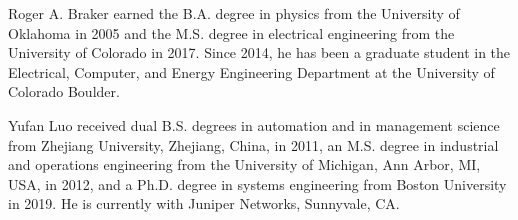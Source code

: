 \documentclass[journal]{IEEEtran}
\begin{document}
\vspace{-2em}
\parbox[][][t]{1\columnwidth}{
\begin{IEEEbiography}
  {Roger A. Braker} earned the B.A. degree in physics from the University of Oklahoma in 2005 and the M.S. degree in electrical engineering from the University of Colorado in 2017.
  Since 2014, he has been a graduate student in the Electrical, Computer, and Energy Engineering
  Department at the University of Colorado Boulder.
\end{IEEEbiography}\vspace{-2em}
\baselineskip=1pt
\begin{IEEEbiography}
  {Yufan Luo}
received dual B.S. degrees in automation and in management science from Zhejiang University, Zhejiang, China, in 2011, an M.S. degree in industrial and operations engineering from the University of Michigan, Ann Arbor, MI, USA, in 2012, and a Ph.D. degree in systems engineering from Boston University in 2019. He is currently with Juniper Networks, Sunnyvale, CA.
\end{IEEEbiography}\vspace{-2em}
\begin{IEEEbiography}

\end{IEEEbiography}}
\end{document}
